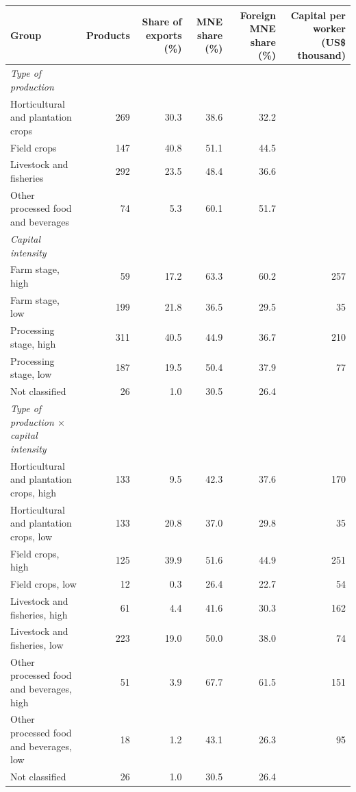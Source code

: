 \begin{tabular}{lrrrrr}
\toprule
Group & Products & Share of exports (\%) & MNE share (\%) & Foreign MNE share (\%) & Capital per worker (US\$ thousand) \\
\midrule
\textit{Type of production} &  &  &  &  &  \\
Horticultural and plantation crops & 269 & 30.3 & 38.6 & 32.2 &  \\
Field crops & 147 & 40.8 & 51.1 & 44.5 &  \\
Livestock and fisheries & 292 & 23.5 & 48.4 & 36.6 &  \\
Other processed food and beverages & 74 & 5.3 & 60.1 & 51.7 &  \\
\textit{Capital intensity} &  &  &  &  &  \\
Farm stage, high & 59 & 17.2 & 63.3 & 60.2 & 257 \\
Farm stage, low & 199 & 21.8 & 36.5 & 29.5 & 35 \\
Processing stage, high & 311 & 40.5 & 44.9 & 36.7 & 210 \\
Processing stage, low & 187 & 19.5 & 50.4 & 37.9 & 77 \\
Not classified & 26 & 1.0 & 30.5 & 26.4 &  \\
\textit{Type of production $\times$ capital intensity} &  &  &  &  &  \\
Horticultural and plantation crops, high & 133 & 9.5 & 42.3 & 37.6 & 170 \\
Horticultural and plantation crops, low & 133 & 20.8 & 37.0 & 29.8 & 35 \\
Field crops, high & 125 & 39.9 & 51.6 & 44.9 & 251 \\
Field crops, low & 12 & 0.3 & 26.4 & 22.7 & 54 \\
Livestock and fisheries, high & 61 & 4.4 & 41.6 & 30.3 & 162 \\
Livestock and fisheries, low & 223 & 19.0 & 50.0 & 38.0 & 74 \\
Other processed food and beverages, high & 51 & 3.9 & 67.7 & 61.5 & 151 \\
Other processed food and beverages, low & 18 & 1.2 & 43.1 & 26.3 & 95 \\
Not classified & 26 & 1.0 & 30.5 & 26.4 &  \\
\bottomrule
\end{tabular}
